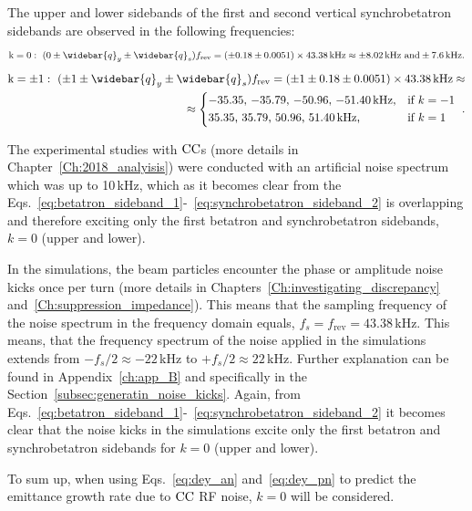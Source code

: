 The upper and lower sidebands of the first and second vertical synchrobetatron sidebands are observed in the following frequencies:
\begin{equation}\label{eq:synchrobetatron_sideband_1}
    \mathrm{k=0}: \ (0 \pm \widebar{q}_y \pm \widebar{q}_s) f_\mathrm{rev} = (\pm 0.18 \pm 0.0051) \times 43.38\mathrm{\,kHz} \approx \pm 8.02\mathrm{\,kHz} \ \mathrm{and} \pm 7.6\mathrm{\,kHz}.
\end{equation}
\begin{equation}\label{eq:synchrobetatron_sideband_2}
    \begin{split}
    \mathrm{k= \pm 1}: \ (\pm 1 \pm \widebar{q}_y \pm \widebar{q}_s) f_\mathrm{rev} = (\pm 1 \pm 0.18 \pm 0.0051)\times 43.38\mathrm{\,kHz} \approx \\ 
    \approx \begin{dcases*} 
        \text{$-$35.35, $-$35.79, $-$50.96, $-$51.40\,kHz,} & if  $k=-1$ \\ 
        \text{35.35, 35.79, 50.96, 51.40\,kHz,} & if  $k=1$  
        \end{dcases*} .
    \end{split}
\end{equation}


The experimental studies with ${\mathrm{CC}}$s (more details in Chapter~\ref{Ch:2018_analyisis}) were conducted with an artificial noise spectrum which was up to 10\,kHz, which as it becomes clear from the Eqs.~\eqref{eq:betatron_sideband_1}-~\eqref{eq:synchrobetatron_sideband_2} is overlapping and therefore exciting only the first betatron and synchrobetatron sidebands, $k=0$ (upper and lower).

In the simulations, the beam particles encounter the phase or amplitude noise kicks once per turn (more details in Chapters~\ref{Ch:investigating_discrepancy} and~\ref{Ch:suppression_impedance}). This means that the sampling frequency of the noise spectrum in the frequency domain equals, $f_s=f_\mathrm{rev}=43.38$\,kHz. This means, that the frequency spectrum of the noise applied in the simulations extends from $-f_s/2 \approx -22$\,kHz to $+f_s/2 \approx 22$\,kHz. Further explanation can be found in Appendix~\ref{ch:app_B} and specifically in the Section~\ref{subsec:generatin_noise_kicks}. Again, from Eqs.~\eqref{eq:betatron_sideband_1}-~\eqref{eq:synchrobetatron_sideband_2} it becomes clear that the noise kicks in the simulations excite only the first betatron and synchrobetatron sidebands for $k=0$ (upper and lower).

To sum up, when using Eqs.~\eqref{eq:dey_an} and~\eqref{eq:dey_pn} to predict the emittance growth rate due to ${\mathrm{CC}}$ RF noise, $k=0$ will be considered.

